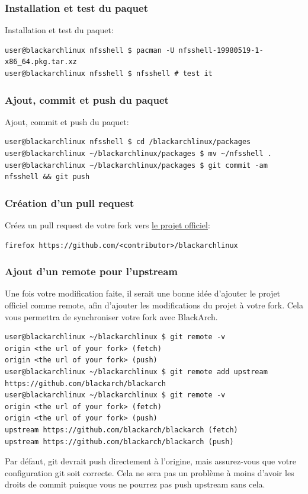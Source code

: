 \documentclass[a4paper, oneside, 11pt]{book}
\begin{document}
\subsubsection{Installation et test du paquet}
Installation et test du paquet:
{\small
\color{gray}
\begin{verbatim}
user@blackarchlinux nfsshell $ pacman -U nfsshell-19980519-1-x86_64.pkg.tar.xz
user@blackarchlinux nfsshell $ nfsshell # test it
\end{verbatim}
}

\subsubsection{Ajout, commit et push du paquet}
Ajout, commit et push du paquet:
{\small
\color{gray}
\begin{verbatim}
user@blackarchlinux nfsshell $ cd /blackarchlinux/packages
user@blackarchlinux ~/blackarchlinux/packages $ mv ~/nfsshell .
user@blackarchlinux ~/blackarchlinux/packages $ git commit -am nfsshell && git push
\end{verbatim}
}

\subsubsection{Création d'un pull request}
Créez un pull request de votre fork vers
 \href{https://github.com/BlackArchLinux/blackarchlinux}{le projet officiel}:
{\small
\color{gray}
\begin{verbatim}
firefox https://github.com/<contributor>/blackarchlinux
\end{verbatim}
}

\subsubsection{Ajout d'un remote pour l'upstream}
Une fois votre modification faite, il serait une bonne idée d'ajouter le projet
officiel comme remote, afin d'ajouter les modifications du projet à votre fork.
Cela vous permettra de synchroniser votre fork avec BlackArch.
{\small
\color{gray}
\begin{verbatim}
user@blackarchlinux ~/blackarchlinux $ git remote -v
origin <the url of your fork> (fetch)
origin <the url of your fork> (push)
user@blackarchlinux ~/blackarchlinux $ git remote add upstream https://github.com/blackarch/blackarch
user@blackarchlinux ~/blackarchlinux $ git remote -v
origin <the url of your fork> (fetch)
origin <the url of your fork> (push)
upstream https://github.com/blackarch/blackarch (fetch)
upstream https://github.com/blackarch/blackarch (push)
\end{verbatim}
}
Par défaut, git devrait push directement à l'origine, mais assurez-vous que
votre configuration git soit correcte. Cela ne sera pas un problème à moins
d'avoir les droits de commit puisque vous ne pourrez pas push upstream sans
cela.
\end{document}
